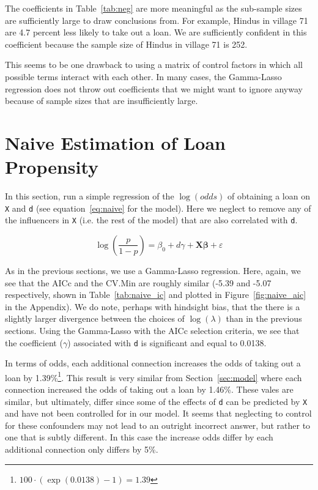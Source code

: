 \documentclass[11pt, fleqn]{article}
\begin{document}
The coefficients in Table~\ref{tab:neg} are more meaningful as the sub-sample sizes are sufficiently large to draw conclusions from. For example, Hindus in village 71 are 4.7 percent less likely to take out a loan. We are sufficiently confident in this coefficient because the sample size of Hindus in village 71 is 252. 

This seems to be one drawback to using a matrix of control factors in which all possible terms interact with each other. In many cases, the Gamma-Lasso regression does not throw out coefficients that we might want to ignore anyway because of sample sizes that are insufficiently large. 




\section{Naive Estimation of Loan Propensity}

In this section, run a simple regression of the $\log(odds)$ of obtaining a loan on \texttt{X} and \texttt{d} (see equation~\ref{eq:naive} for the model).  Here we neglect to remove any of the influencers in \texttt{X} (i.e. the rest of the model) that are also correlated with \texttt{d}.

\begin{equation} \label{eq:naive}
\log\left(\frac{p}{1-p}\right) = \beta_0 + d \gamma + \bm{X}\bm{\beta} + \varepsilon
\end{equation}

As in the previous sections, we use a Gamma-Lasso regression.  Here, again, we see that the AICc and the CV.Min are roughly similar (-5.39 and -5.07 respectively, shown in Table~\ref{tab:naive_ic} and plotted in Figure~\ref{fig:naive_aic} in the Appendix).  We do note, perhaps with hindsight bias, that the there is a slightly larger divergence between the choices of $\log(\lambda)$ than in the previous sections.  Using the Gamma-Lasso with the AICc selection criteria, we see that the coefficient ($\gamma$) associated with \texttt{d} is significant and equal to 0.0138.

In terms of odds, each additional connection increases the odds of taking out a loan by 1.39\%\footnote{$100 \cdot \left( \exp(0.0138) - 1\right) = 1.39$}.  This result is very similar from Section~\ref{sec:model} where each connection increased the odds of taking out a loan by 1.46\%.  These vales are similar, but ultimately, differ since some of the effects of \texttt{d} can be predicted by \texttt{X} and have not been controlled for in our model.  It seems that neglecting to control for these confounders may not lead to an outright incorrect answer, but rather to one that is subtly different.  In this case the increase odds differ by each additional connection only differs by 5\%.
\end{document}

